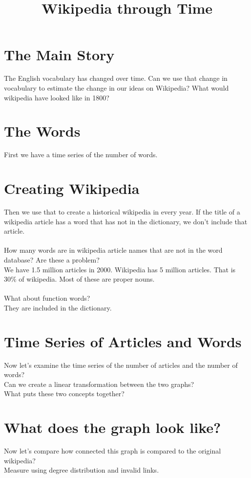 \documentclass[11pt]{article}
\title{\textbf{Wikipedia through Time}}
\date{}
\begin{document}
\maketitle

\section{The Main Story}
The English vocabulary has changed over time. Can we use that change in vocabulary to estimate the change in our ideas on Wikipedia? What would wikipedia have looked like in 1800?

\section{The Words}
First we have a time series of the number of words.

\section{Creating Wikipedia}
Then we use that to create a historical wikipedia in every year. If the title of a wikipedia article has a word that has not in the dictionary, we don't include that article.\\\\
How many words are in wikipedia article names that are not in the word database? Are these a problem? \\
\indent We have 1.5 million articles in 2000. Wikipedia has 5 million articles. That is 30\% of wikipedia. Most of these are proper nouns.\\\\
What about function words?\\
\indent They are included in the dictionary.

\section{Time Series of Articles and Words}
Now let's examine the time series of the number of articles and the number of words?\\
Can we create a linear transformation between the two graphs?\\
What puts these two concepts together?
    
\section{What does the graph look like?}
Now let's compare how connected this graph is compared to the original wikipedia?\\
Measure using degree distribution and invalid links.
\end{document}
